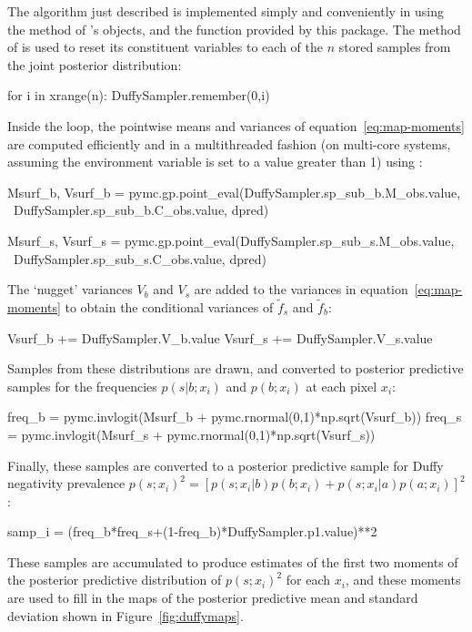 \documentclass[article]{jss}
\begin{document}
\bigskip
The algorithm just described is implemented simply and conveniently in  using the  method of 's  objects, and the  function provided by this package. The  method of  is used to reset its constituent variables to each of the $n$ stored samples from the joint posterior distribution:
\begin{CodeInput}
for i in xrange(n):
    DuffySampler.remember(0,i)
\end{CodeInput}
Inside the loop, the pointwise means and variances of equation~\ref{eq:map-moments} are computed efficiently and in a multithreaded fashion (on multi-core systems, assuming the environment variable  is set to a value greater than 1) using :
\begin{CodeInput}
    Msurf_b, Vsurf_b = pymc.gp.point_eval(DuffySampler.sp_sub_b.M_obs.value, \
        DuffySampler.sp_sub_b.C_obs.value, dpred)
    
    Msurf_s, Vsurf_s = pymc.gp.point_eval(DuffySampler.sp_sub_s.M_obs.value, \
        DuffySampler.sp_sub_s.C_obs.value, dpred)
\end{CodeInput}
The `nugget' variances $V_b$ and $V_s$ are added to the variances in equation~\ref{eq:map-moments} to obtain the conditional variances of $\tilde f_s$ and $\tilde f_b$:        
\begin{CodeInput} 
    Vsurf_b += DuffySampler.V_b.value
    Vsurf_s += DuffySampler.V_s.value
\end{CodeInput}
 Samples from these distributions are drawn, and converted to posterior predictive samples for the frequencies $p(s|b;x_i)$ and $p(b;x_i)$ at each pixel $x_i$:
\begin{CodeInput}
    freq_b = pymc.invlogit(Msurf_b + pymc.rnormal(0,1)*np.sqrt(Vsurf_b))
    freq_s = pymc.invlogit(Msurf_s + pymc.rnormal(0,1)*np.sqrt(Vsurf_s))
\end{CodeInput}
Finally, these samples are converted to a posterior predictive sample for Duffy negativity prevalence $p(s;x_i)^2=[p(s;x_i|b)p(b;x_i)+p(s;x_i|a)p(a;x_i)]^2$:
\begin{CodeInput}
    samp_i = (freq_b*freq_s+(1-freq_b)*DuffySampler.p1.value)**2
\end{CodeInput}
These samples are accumulated to produce estimates of the first two moments of the posterior predictive distribution of $p(s;x_i)^2$ for each $x_i$, and these moments are used to fill in the maps of the posterior predictive mean and standard deviation shown in Figure~\ref{fig:duffymaps}.
\end{document}
